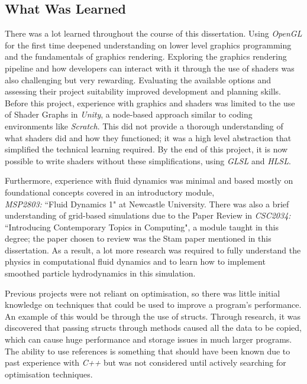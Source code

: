 \documentclass[12pt]{article}
\begin{document}
    \subsection{What Was Learned}

    There was a lot learned throughout the course of this dissertation. Using \textit{OpenGL} for the first time deepened understanding on lower level graphics programming and the fundamentals of graphics rendering. Exploring the graphics rendering pipeline and how developers can interact with it through the use of shaders was also challenging but very rewarding. Evaluating the available options and assessing their project suitability improved development and planning skills. Before this project, experience with graphics and shaders was limited to the use of Shader Graphs in \textit{Unity}, a node-based approach similar to coding environments like \textit{Scratch}. This did not provide a thorough understanding of what shaders did and how they functioned; it was a high level abstraction that simplified the technical learning required. By the end of this project, it is now possible to write shaders without these simplifications, using \textit{GLSL} and \textit{HLSL}.

    Furthermore, experience with fluid dynamics was minimal and based mostly on foundational concepts covered in an introductory module, \\ \emph{MSP2803:} ``Fluid Dynamics 1" at Newcastle University. There was also a brief understanding of grid-based simulations due to the Paper Review in \emph{CSC2034:} ``Introducing Contemporary Topics in Computing", a module taught in this degree; the paper chosen to review was the Stam paper mentioned in this dissertation\cite{stam}. As a result, a lot more research was required to fully understand the physics in computational fluid dynamics and to learn how to implement smoothed particle hydrodynamics in this simulation.

    Previous projects were not reliant on optimisation, so there was little initial knowledge on techniques that could be used to improve a program's performance. An example of this would be through the use of structs. Through research, it was discovered that passing structs through methods caused all the data to be copied, which can cause huge performance and storage issues in much larger programs. The ability to use references is something that should have been known due to past experience with \textit{C++} but was not considered until actively searching for optimisation techniques.
    
\end{document}
